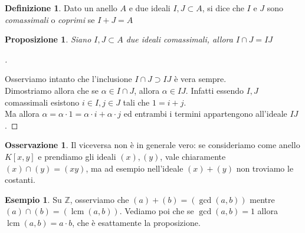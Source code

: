 \documentclass[a4paper,10pt]{article}
\theoremstyle{plain}
\newtheorem{prop}[thm]{Proposizione}
\theoremstyle{definition}
\newtheorem{defn}{Definizione}[section]
\newtheorem*{exmp}{Esempio}
\newtheorem*{oss}{Osservazione}
\newenvironment{myproof}[1][\proofname]{%
  \begin{proof}[#1]$ $\par\nobreak\ignorespaces
}{%
  \qedhere
  \end{proof}
}
\DeclareMathOperator{\lcm}{lcm}
\newcommand{\Z}{\mathbb{Z}}
\begin{document}
\begin{defn}
    Dato un anello $A$ e due ideali $I,J\subset A$, si dice che $I$ e $J$ sono \textit{comassimali} o \textit{coprimi} se $I+J=A$
\end{defn}
\begin{prop}
    Siano $I,J\subset A$ due ideali comassimali, allora $I\cap J = IJ$
\end{prop}
\begin{myproof}
    Osserviamo intanto che l'inclusione $I\cap J\supset IJ$ è vera sempre.\\
    Dimostriamo allora che se $\alpha\in I\cap J$, allora $\alpha\in IJ$. Infatti essendo $I,J$ comassimali esistono $i\in I,j\in J$ tali che $1=i+j$.\\
    Ma allora $\alpha=\alpha\cdot1=\alpha\cdot i+\alpha\cdot j$ ed entrambi i termini appartengono all'ideale $IJ$.
\end{myproof}
\begin{oss}
    Il viceversa non è in generale vero: se consideriamo come anello $K[x,y]$ e prendiamo gli ideali $(x),(y)$, vale chiaramente $(x)\cap(y)=(xy)$, ma ad esempio nell'ideale $(x)+(y)$ non troviamo le costanti.
\end{oss}
\begin{exmp}
    Su $\Z$, osserviamo che $(a)+(b)=(\gcd(a,b))$ mentre $(a)\cap(b)=(\lcm(a,b))$. Vediamo poi che se $\gcd(a,b)=1$ allora $\lcm(a,b)=a\cdot b$, che è esattamente la proposizione.
\end{exmp}
\end{document}
